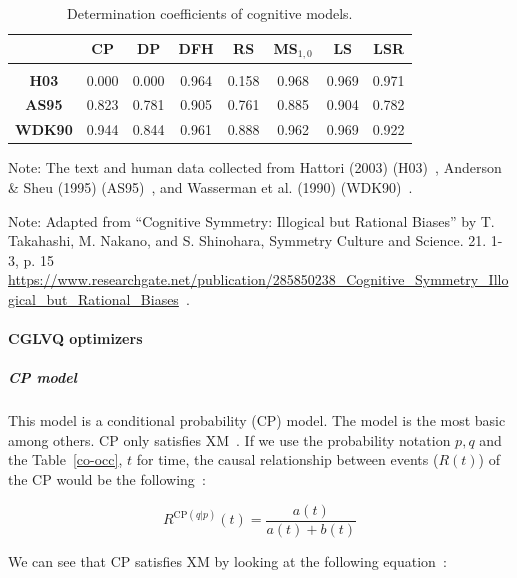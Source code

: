\begin{table}[H]
\centering
\begin{tabular}{c c c c c c c c}
&\textbf{CP}&\textbf{DP}&\textbf{DFH}&\textbf{RS}&\textbf{MS$_{1,0}$}&\textbf{LS}&\textbf{LSR}\\
\hline\\
\textbf{H03}&0.000&0.000&0.964&0.158&0.968&0.969&0.971\\
\textbf{AS95}&0.823&0.781&0.905&0.761&0.885&0.904&0.782\\
\textbf{WDK90}&0.944&0.844&0.961&0.888&0.962&0.969&0.922\\
\end{tabular}
\caption{Determination coefficients of cognitive models.}
\label{cogntable}
\end{table}

\noindent Note: The text and human data collected from Hattori (2003) (H03)~\cite{hattori03}, Anderson \& Sheu (1995) (AS95)~\cite{ander95}, and Wasserman et al. (1990) (WDK90)~\cite{wasser}.
\vspace{5pt}

\noindent Note: Adapted from “Cognitive Symmetry: Illogical but Rational Biases” by T. Takahashi, M. Nakano, and S. Shinohara, Symmetry Culture and Science. 21. 1-3, p. 15 \url{https://www.researchgate.net/publication/285850238_Cognitive_Symmetry_Illogical_but_Rational_Biases}~\cite{cogn}.


\paragraph{CGLVQ optimizers}



\subparagraph{CP model}

This model is a conditional probability (CP) model. The model is the most basic among others. CP only satisfies XM~\cite{cogn}. If we use the probability notation $p,q$ and the Table~\ref{co-occ}, $t$ for time, the causal relationship between events ($R(t)$) of the CP would be the following~\cite{cogn,lrimp}:
\vspace{10pt}

\begin{equation}
R^{\text{CP}(q|p)}(t) = \frac{a(t)}{a(t)+b(t)}
\end{equation}
\vspace{10pt}

We can see that CP satisfies XM by looking at the following equation~\cite{cogn}:
\vspace{10pt}


